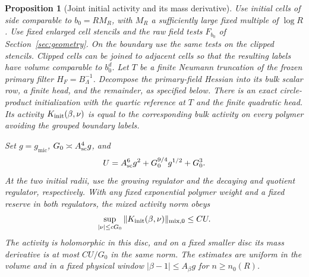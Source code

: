 \documentclass[11pt]{article}
\newtheorem{proposition}[theorem]{Proposition}
\theoremstyle{definition}
\begin{document}
\begin{proposition}[Joint initial activity and its mass derivative]
\label{prop:cube-joint-initialization}
Use initial cells of side comparable to \(b_0=RM_R\), with
\(M_R\) a sufficiently large fixed multiple of \(\log R\). Use
fixed enlarged cell stencils and the raw field tests \(F_{b_0}\)
of Section~\ref{sec:geometry}. On the boundary use the same tests
on the clipped stencils. Clipped cells can be joined to adjacent
cells so that the resulting labels have volume comparable to
\(b_0^d\). Let \(T\) be a finite Neumann truncation of the frozen
primary filter \(H_F=B_\Lambda^{-1}\). Decompose the primary-field
Hessian into its bulk scalar row, a finite head, and the remainder,
as specified below. There is an exact circle-product initialization
with the quartic reference at \(T\) and the finite quadratic head.
Its activity \(K_{\rm init}(\beta,\nu)\) is equal to the corresponding
bulk activity on every polymer avoiding the grouped boundary labels.

Set \(g=g_{\mathrm{mic}}\), \(G_0\asymp A_{\rm sc}^4g\), and
\begin{equation}
 U=A_{\rm sc}^6g^2+G_0^{9/4}g^{1/2}+G_0^3 .
\end{equation}
At the two initial radii, use the growing regulator and the
decaying and quotient regulator, respectively. With any fixed
exponential polymer weight and a fixed reserve in both regulators,
the mixed activity norm obeys
\begin{equation}
 \sup_{|\nu|\le cG_0}\|K_{\rm init}(\beta,\nu)\|_{\mathrm{mix},0}
 \le C U .
 \label{eq:cube-joint-init}
\end{equation}
The activity is holomorphic in this disc, and on a fixed smaller
disc its mass derivative is at most \(CU/G_0\) in the same norm.
The estimates are uniform in the volume and in a fixed physical
window \(|\beta-1|\le A_\beta g\) for \(n\ge n_0(R)\).
\end{proposition}
\end{document}

